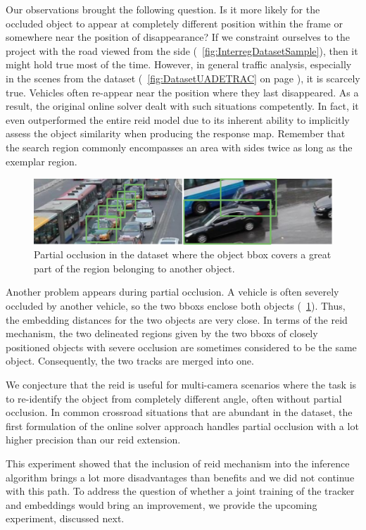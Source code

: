 Our observations brought the following question. Is it more likely for the occluded object to appear at completely different position within the frame or somewhere near the position of disappearance? If we constraint ourselves to the \interreg{} project with the road viewed from the side (\figtext{}~\ref{fig:InterregDatasetSample}), then it might hold true most of the time. However, in general traffic analysis, especially in the scenes from the \uadetrac{} dataset (\figtext{}~\ref{fig:DatasetUADETRAC} on page \pageref{fig:DatasetUADETRAC}), it is scarcely true. Vehicles often re-appear near the position where they last disappeared. As a result, the original online solver dealt with such situations competently. In fact, it even outperformed the entire \gls{reid} model due to its inherent ability to implicitly assess the object similarity when producing the response map. Remember that the search region commonly encompasses an area with sides twice as long as the exemplar region.

\begin{figure}[!t]
    \centering
    \includegraphics[width=\linewidth]{figures/siamese_tracking/uadetrac_partial_occlusion_multiple_cars.pdf}
    \caption[Partial occlusion in \uadetrac{} dataset]{Partial occlusion in the \uadetrac{} dataset where the object \gls{bbox} covers a great part of the region belonging to another object.}
    \label{fig:UADETRACPartialOcclusionMultiple}
\end{figure}

Another problem appears during partial occlusion. A vehicle is often severely occluded by another vehicle, so the two \glspl{bbox} enclose both objects (\figtext{}~\ref{fig:UADETRACPartialOcclusionMultiple}). Thus, the embedding distances for the two objects are very close. In terms of the \gls{reid} mechanism, the two delineated regions given by the two \glspl{bbox} of closely positioned objects with severe occlusion are sometimes considered to be the same object. Consequently, the two tracks are merged into one.

We conjecture that the \gls{reid} is useful for multi-camera scenarios where the task is to re-identify the object from completely different angle, often without partial occlusion. In common crossroad situations that are abundant in the \uadetrac{} dataset, the first formulation of the online solver approach handles partial occlusion with a lot higher precision than our \gls{reid} extension.

This experiment showed that the inclusion of \gls{reid} mechanism into the inference algorithm brings a lot more disadvantages than benefits and we did not continue with this path. To address the question of whether a joint training of the tracker and embeddings would bring an improvement, we provide the upcoming experiment, discussed next.

